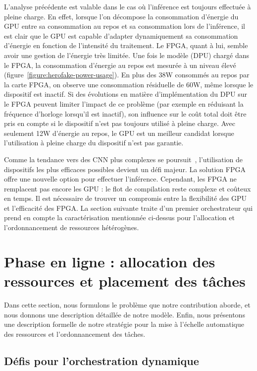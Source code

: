 L'analyse précédente est valable dans le cas où l'inférence est toujours effectuée à pleine charge. En effet, lorsque l'on décompose la consommation d'énergie du GPU entre sa consommation au repos et sa consommation lors de l'inférence, il est clair que le GPU est capable d'adapter dynamiquement sa consommation d'énergie en fonction de l'intensité du traitement. Le FPGA, quant à lui, semble avoir une gestion de l'énergie très limitée. Une fois le modèle (DPU) chargé dans le FPGA, la consommation d'énergie au repos est mesurée à un niveau élevé (figure~\ref{figure:herofake-power-usage}). En plus des 38W consommés au repos par la carte FPGA, on observe une consommation résiduelle de 60W, même lorsque le dispositif est inactif. Si des évolutions en matière d'implémentation du DPU sur le FPGA peuvent limiter l'impact de ce problème (par exemple en réduisant la fréquence d'horloge lorsqu'il est inactif), son influence sur le coût total doit être pris en compte si le dispositif n'est pas toujours utilisé à pleine charge. Avec seulement 12W d'énergie au repos, le GPU est un meilleur candidat lorsque l'utilisation à pleine charge du dispositif n'est pas garantie.

Comme la tendance vers des CNN plus complexes se poursuit~\cite{8807741}, l'utilisation de dispositifs les plus efficaces possibles devient un défi majeur. La solution FPGA offre une nouvelle option pour effectuer l'inférence. Cependant, les FPGA ne remplacent pas encore les GPU : le flot de compilation reste complexe et coûteux en temps. Il est nécessaire de trouver un compromis entre la flexibilité des GPU et l'efficacité des FPGA. La section suivante traite d'un premier orchestrateur qui prend en compte la caractérisation mentionnée ci-dessus pour l'allocation et l'ordonnancement de ressources hétérogènes.

\section{Phase en ligne : allocation des ressources et placement des tâches}
\label{section:herofake-online}

Dans cette section, nous formulons le problème que notre contribution aborde, et nous donnons une description détaillée de notre modèle. Enfin, nous présentons une description formelle de notre stratégie pour la mise à l'échelle automatique des ressources et l'ordonnancement des tâches. 

\subsection{Défis pour l'orchestration dynamique}

